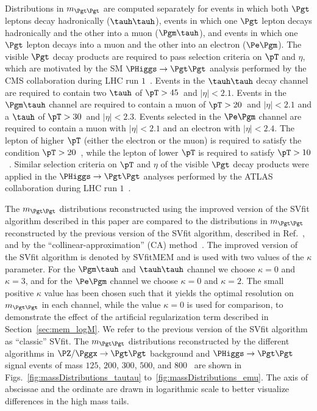 Distributions in $m_{\Pgt\Pgt}$ are computed separately for events in which 
both $\Pgt$ leptons decay hadronically ($\tauh\tauh$), 
events in which one $\Pgt$ lepton decays hadronically and the other into a muon ($\Pgm\tauh$),
and events in which one $\Pgt$ lepton decays into a muon and the other into an electron ($\Pe\Pgm$).
The visible $\Pgt$ decay products are required to pass selection criteria on $\pT$ and $\eta$,
which are motivated by the SM $\PHiggs \to \Pgt\Pgt$ analysis performed by the CMS collaboration during LHC run $1$~\cite{HIG-13-004}.
Events in the $\tauh\tauh$ decay channel are required to contain
two $\tauh$ of $\pT > 45$~\GeV and $\vert\eta\vert < 2.1$.
Events in the $\Pgm\tauh$ channel
are required to contain a muon of $\pT > 20$~\GeV and $\vert\eta\vert < 2.1$ and a $\tauh$ of $\pT > 30$~\GeV and $\vert\eta\vert < 2.3$.
Events selected in the $\Pe\Pgm$ channel are required to contain a muon with $\vert\eta\vert < 2.1$ and an electron with $\vert\eta\vert < 2.4$.
The lepton of higher $\pT$ (either the electron or the muon) is required to satisfy the condition $\pT > 20$~\GeV,
while the lepton of lower $\pT$ is required to satisfy $\pT > 10$~\GeV.
Similar selection criteria on $\pT$ and $\eta$ of the visible $\Pgt$ decay products were applied in the $\PHiggs \to \Pgt\Pgt$
analyses performed by the ATLAS
collaboration during LHC run $1$~\cite{ATLAS_HiggsTauTau_SM,ATLAS_HiggsTauTau_MSSM}.

The $m_{\Pgt\Pgt}$ distributions reconstructed using the 
improved version of the SVfit algorithm described in this paper
are compared to the distributions in $m_{\Pgt\Pgt}$ reconstructed by the previous version of the
SVfit algorithm, described in Ref.~\cite{SVfit}, and by the ``collinear-approximation'' (CA)
method~\cite{massRecoCollinearApprox}.
The improved version of the SVfit algorithm is denoted by SVfitMEM 
and is used with two values of the $\kappa$ parameter.
For the $\Pgm\tauh$ and $\tauh\tauh$ channel we choose $\kappa = 0$ and $\kappa = 3$,
and for the $\Pe\Pgm$ channel we choose $\kappa = 0$ and $\kappa = 2$.
The small positive $\kappa$ value has been chosen such that it yields
the optimal resolution on $m_{\Pgt\Pgt}$ in each channel,
while the value $\kappa = 0$ is used for comparison, to demonstrate the effect of the artificial regularization term described in Section~\ref{sec:mem_logM}.
We refer to the previous version of the SVfit algorithm as ``classic'' SVfit.
The $m_{\Pgt\Pgt}$ distributions reconstructed by the different algorithms
in $\PZ/\Pggx \to \Pgt\Pgt$ background and $\PHiggs \to \Pgt\Pgt$ signal events
of mass $125$, $200$, $300$, $500$, and $800$~\GeV
are shown in Figs.~\ref{fig:massDistributions_tautau} to~\ref{fig:massDistributions_emu}.
The axis of abscissae and the ordinate are drawn in logarithmic scale to better visualize differences in the high mass tails.

